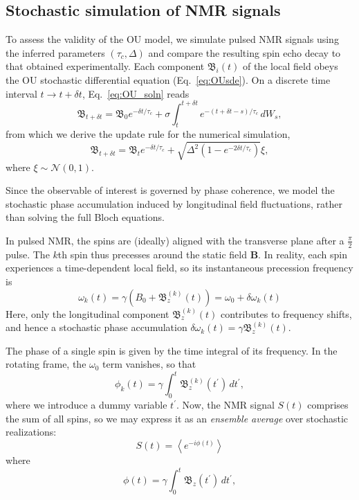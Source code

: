\documentclass[%
 reprint,
 amsmath,amssymb,
 aps,
]{revtex4-2}
\begin{document}
\subsection{Stochastic simulation of NMR signals}
\label{sec:simulation}
To assess the validity of the OU model, we simulate pulsed NMR signals using the inferred parameters $\left(\tau_c,\Delta\right)$ and compare the resulting spin echo decay to that obtained experimentally. Each component $\mathfrak{B}_i (t)$ of the local field obeys the OU stochastic differential equation (Eq.~\ref{eq:OUsde}). On a discrete time interval $t\rightarrow t+\delta t$, Eq.~\ref{eq:OU_soln} reads
\begin{equation*}
    \mathfrak{B}_{t+\delta t} = \mathfrak{B}_0 e^{-\delta t/\tau_c}
    + \sigma \int_t^{t+\delta t} e^{-(t+\delta t-s)/\tau_c}\, dW_s,
\end{equation*}
from which we derive the update rule for the numerical simulation,
\begin{equation*}
    \mathfrak{B}_{t+\delta t} = \mathfrak{B}_t e^{-\delta t/\tau_c} + \sqrt{\Delta^2\left(1-e^{-2\delta t/\tau_c}\right)}\xi,
\end{equation*}
where $\xi \sim \mathcal{N}\left(0,1\right)$.

Since the observable of interest is governed by phase coherence, we model the stochastic phase accumulation induced by longitudinal field fluctuations, rather than solving the full Bloch equations.

In pulsed NMR, the spins are (ideally) aligned with the transverse plane after a $\tfrac{\pi}{2}$ pulse. The $k$th spin thus precesses around the static field $\mathbf{B}$. In reality, each spin experiences a time-dependent local field, so its instantaneous precession frequency is
\begin{equation*}
    \omega_k (t) = \gamma\left(B_0 + \mathfrak{B}_z^{(k)}(t)\right) = \omega_0 + \delta\omega_k (t)
\end{equation*}
Here, only the longitudinal component $\mathfrak{B}_z^{(k)}(t)$ contributes to frequency shifts, and hence a stochastic phase accumulation $\delta\omega_k (t) = \gamma\mathfrak{B}_z^{(k)}(t)$.

The phase of a single spin is given by the time integral of its frequency. In the rotating frame, the $\omega_0$ term vanishes, so that
\begin{equation*}
    \phi_k (t) = \gamma\int_{0}^t \mathfrak{B}_z^{(k)}(t^\prime)\,dt^{\prime},
\end{equation*}
where we introduce a dummy variable $t^\prime$. Now, the NMR signal $S(t)$ comprises the sum of all spins, so we may express it as an \textit{ensemble average} over stochastic realizations:
\begin{equation}
    S(t) = \left\langle e^{-i\phi (t)}\right\rangle
    \label{eq:simulated_signal}
\end{equation}
where
\begin{equation}
    \phi (t) = \gamma\int_{0}^t \mathfrak{B}_z (t^\prime)\,dt^{\prime},
    \label{eq:stochastic_phase}
\end{equation}
\end{document}
